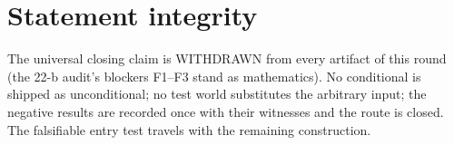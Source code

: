 \documentclass[11pt]{article}
\begin{document}
\section*{Statement integrity}

The universal closing claim is WITHDRAWN from every artifact of this round (the 22-b audit's blockers F1--F3 stand as mathematics). No conditional is shipped as unconditional; no test world substitutes the arbitrary input; the negative results are recorded once with their witnesses and the route is closed. The falsifiable entry test travels with the remaining construction.
\end{document}
